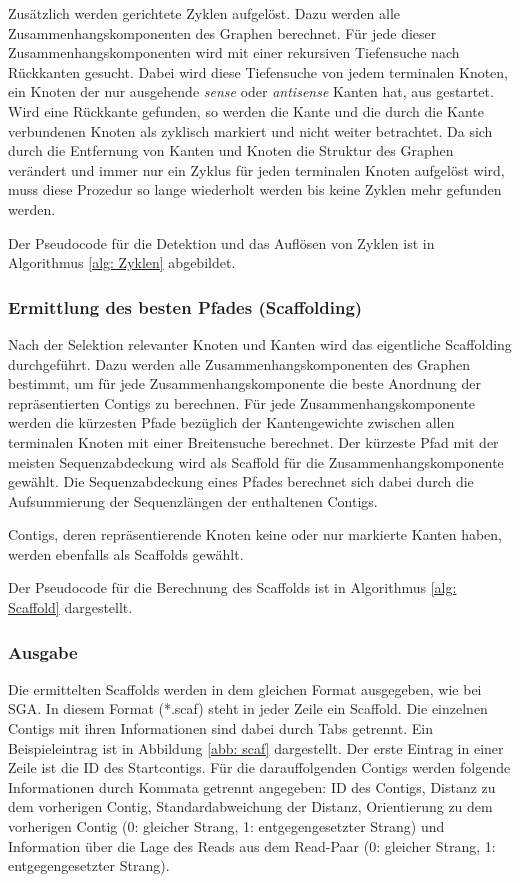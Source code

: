 \documentclass[a4paper,11pt,parskip]{scrartcl}
\begin{document}
Zusätzlich werden gerichtete Zyklen aufgelöst. Dazu werden alle
Zusammenhangskomponenten des Graphen berechnet. Für jede dieser
Zusammenhangskomponenten wird mit einer rekursiven Tiefensuche nach
Rückkanten gesucht. Dabei wird diese Tiefensuche von jedem terminalen
Knoten, ein Knoten der nur ausgehende \textit{sense} oder
\textit{antisense} Kanten hat, aus gestartet. Wird eine Rückkante
gefunden, so werden die Kante und die durch die Kante verbundenen
Knoten als zyklisch markiert und nicht weiter betrachtet. Da sich
durch die Entfernung von Kanten und Knoten die Struktur des Graphen
verändert und immer nur ein Zyklus für jeden terminalen Knoten
aufgelöst wird, muss diese Prozedur so lange wiederholt werden bis
keine Zyklen mehr gefunden werden.

Der Pseudocode für die Detektion und das Auflösen von Zyklen ist in
Algorithmus \ref{alg: Zyklen} abgebildet.

\subsubsection{Ermittlung des besten Pfades (Scaffolding)}

Nach der Selektion relevanter Knoten und Kanten wird das eigentliche
Scaffolding durchgeführt. Dazu werden alle Zusammenhangskomponenten
des Graphen bestimmt, um für jede Zusammenhangskomponente die beste
Anordnung der repräsentierten Contigs zu berechnen. Für jede
Zusammenhangskomponente werden die kürzesten Pfade bezüglich der
Kantengewichte zwischen allen terminalen Knoten mit einer Breitensuche
berechnet. Der kürzeste Pfad mit der meisten Sequenzabdeckung wird als
Scaffold für die Zusammenhangskomponente gewählt. Die Sequenzabdeckung
eines Pfades berechnet sich dabei durch die Aufsummierung der
Sequenzlängen der enthaltenen Contigs.

Contigs, deren repräsentierende Knoten keine oder nur markierte Kanten
haben, werden ebenfalls als Scaffolds gewählt.

Der Pseudocode für die Berechnung des Scaffolds ist in Algorithmus
\ref{alg: Scaffold} dargestellt.

\subsubsection{Ausgabe}
Die ermittelten Scaffolds werden in dem gleichen Format ausgegeben,
wie bei SGA. In diesem Format (*.scaf) steht in jeder Zeile
ein Scaffold. Die einzelnen Contigs mit ihren Informationen sind dabei
durch Tabs getrennt. Ein Beispieleintrag ist in Abbildung \ref{abb:
  scaf} dargestellt. Der erste Eintrag in einer Zeile ist die ID des
Startcontigs. Für die darauffolgenden Contigs werden folgende
Informationen durch Kommata getrennt angegeben: ID des Contigs, Distanz
zu dem vorherigen Contig, Standardabweichung der Distanz, Orientierung
zu dem vorherigen Contig (0: gleicher Strang, 1: entgegengesetzter
Strang) und Information über die Lage des Reads aus dem Read-Paar (0:
gleicher Strang, 1: entgegengesetzter Strang).
\end{document}
